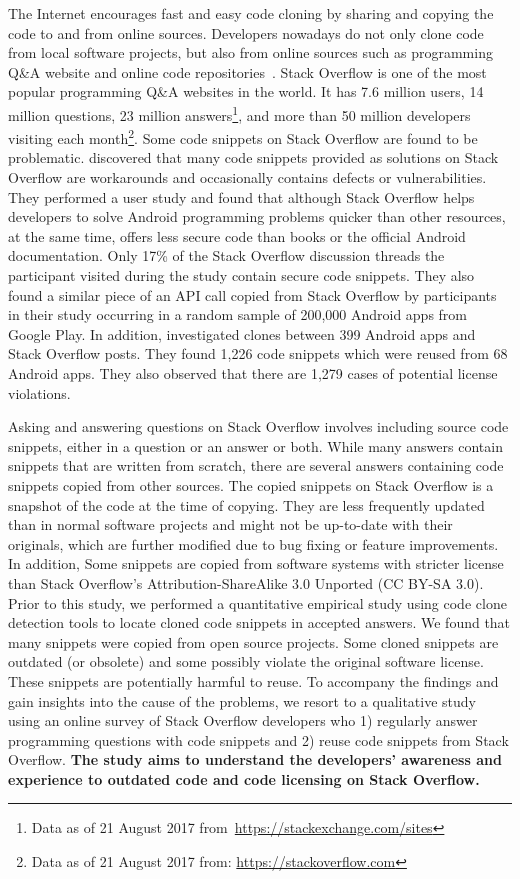 \documentclass{svjour3}                     %
\begin{document}
The Internet encourages fast and easy code cloning by sharing and copying the
code to and from online sources. Developers nowadays do not only clone code from
local software projects, but also from online sources such as programming Q\&A
website and online code
repositories~\citep{Acar2016,Abdalkareem2017,An2017,Yang2017}. Stack Overflow is
one of the most popular programming Q\&A websites in the world. It has 7.6
million users, 14 million questions, 23 million answers\footnote{Data as of 21
	August 2017 from~\url{https://stackexchange.com/sites}}, and more than 50
million developers visiting each month\footnote{Data as of 21 August 2017 from:
	\url{https://stackoverflow.com}}. Some code snippets on Stack Overflow are found
to be problematic. \cite{Acar2016} discovered that many code snippets provided
as solutions on Stack Overflow are workarounds and occasionally contains defects
or vulnerabilities. They performed a user study and found that although Stack
Overflow helps developers to solve Android programming problems quicker than
other resources, at the same time, offers less secure code than books or the
official Android documentation. Only 17\% of the Stack Overflow discussion
threads the participant visited during the study contain secure code snippets.
They also found a similar piece of an API call copied from Stack Overflow by
participants in their study occurring in a random sample of 200,000 Android apps
from Google Play. In addition, \cite{An2017} investigated clones between 399
Android apps and Stack Overflow posts. They found 1,226 code snippets which were
reused from 68 Android apps. They also observed that there are 1,279 cases of
potential license violations.

Asking and answering questions on Stack Overflow involves including source code
snippets, either in a question or an answer or both. While many answers contain
snippets that are written from scratch, there are several answers containing
code snippets copied from other sources. The copied snippets on Stack Overflow
is a snapshot of the code at the time of copying. They are less frequently
updated than in normal software projects and might not be up-to-date with their
originals, which are further modified due to bug fixing or feature improvements.
In addition, Some snippets are copied from software systems with stricter
license than Stack Overflow's Attribution-ShareAlike 3.0 Unported (CC BY-SA
3.0). Prior to this study, we performed a quantitative empirical study using
code clone detection tools to locate cloned code snippets in accepted answers.
We found that many snippets were copied from open source projects. Some cloned
snippets are outdated (or obsolete) and some possibly violate the original software license.
These snippets are potentially harmful to reuse. To accompany the findings and
gain insights into the cause of the problems, we resort to a qualitative study
using an online survey of Stack Overflow developers who 1) regularly answer
programming questions with code snippets and 2) reuse code snippets from Stack
Overflow. \textbf{The study aims to understand the developers' awareness and
	experience to outdated code and code licensing on Stack
	Overflow.} 
\end{document}
